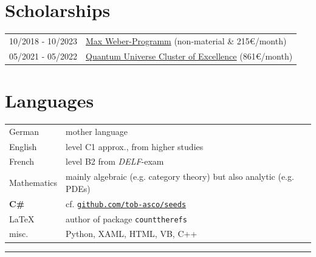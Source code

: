 \documentclass[english,10pt]{article}
\begin{document}
	\section*{Scholarships}
	\begin{tabularx}{\linewidth}{m{3cm}|X}
		10/2018 - 10/2023 & \href{https://www.elitenetzwerk.bayern.de/start/foerderangebote/max-weber-programm}{Max Weber-Programm} \hfill (non-material \& 215€/month)\\
		05/2021 - 05/2022 & \href{https://www.qu.uni-hamburg.de/}{Quantum Universe Cluster of Excellence} \hfill (861€/month)
	\end{tabularx}
	
	\section*{Languages}
	\begin{tabular}{m{3cm} | l}
		German & mother language\\
	English & level C1 approx., from higher studies\\
	French & level B2 from \textit{DELF}-exam\\
	Mathematics & mainly algebraic (e.g. category theory) but also analytic (e.g. PDEs)\\
	\textbf{C\#} & cf. \href{https://github.com/tob-asco/seeds}{\texttt{github.com/tob-asco/seeds}}\\
	\LaTeX & author of package \texttt{counttherefs}\\
	misc. & Python, XAML, HTML, VB, C++
	\end{tabular}
	\hrule
\end{document}
